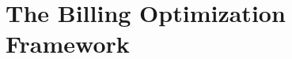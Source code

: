 \chapter{The Billing Optimization Framework}\label{ch:the-billing-optimization-framework}






%
%
%
%
%

